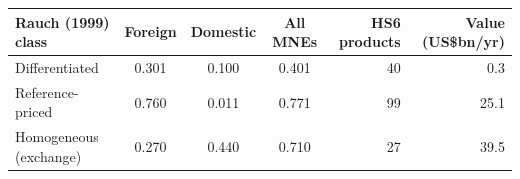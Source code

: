 \begin{tabular}{lcccrr}
\toprule
Rauch (1999) class & Foreign & Domestic & All MNEs & HS6 products & Value (US\$bn/yr) \\
\midrule
Differentiated & 0.301 & 0.100 & 0.401 & 40 & 0.3 \\
Reference-priced & 0.760 & 0.011 & 0.771 & 99 & 25.1 \\
Homogeneous (exchange) & 0.270 & 0.440 & 0.710 & 27 & 39.5 \\
\bottomrule
\end{tabular}
